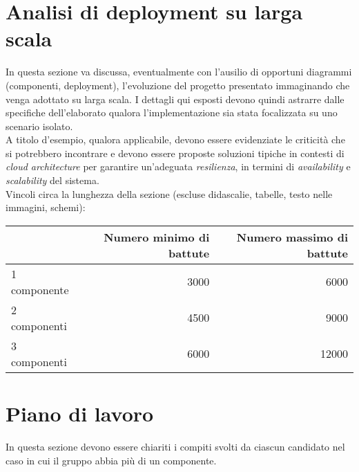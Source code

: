 \documentclass[12pt]{article}
\begin{document}
\newpage



\section{Analisi di deployment su larga scala}

In questa sezione va discussa, eventualmente con l'ausilio di opportuni diagrammi (componenti, deployment), l'evoluzione del progetto presentato immaginando che venga adottato su larga scala. I dettagli qui esposti devono quindi astrarre dalle specifiche dell'elaborato qualora l'implementazione sia stata focalizzata su uno scenario isolato.\\

A titolo d’esempio, qualora applicabile, devono essere evidenziate le criticità che si potrebbero incontrare e devono essere proposte soluzioni tipiche in contesti di \textit{cloud architecture} per garantire un'adeguata \textit{resilienza}, in termini di \textit{availability} e \textit{scalability} del sistema.\\


Vincoli circa la lunghezza della sezione (escluse didascalie, tabelle, testo nelle immagini, schemi):

\vspace{1cm}
\begin{tabular}{l|rr}
 & Numero minimo di battute & Numero massimo di battute \\
 \hline
 1 componente & 3000 & 6000 \\
 2 componenti & 4500 & 9000 \\
 3 componenti & 6000 & 12000 \\
 \hline
\end{tabular}


\newpage



\section{Piano di lavoro}

In questa sezione devono essere chiariti i compiti svolti da ciascun candidato nel caso in cui il gruppo abbia più di un componente.\\
\end{document}

